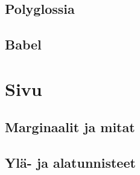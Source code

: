 \subsection{Polyglossia}
\subsection{Babel}

\section{Sivu}
\label{luku:sivuasetukset}
\subsection{Marginaalit ja mitat}
\subsection{Ylä- ja alatunnisteet}
